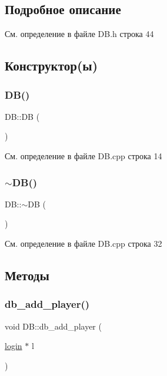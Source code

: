 \subsection{Подробное описание}


См. определение в файле D\+B.\+h строка 44



\subsection{Конструктор(ы)}
\mbox{\label{class_d_b_a29a603c52c10831cddee82518417f992}} 
\subsubsection{\texorpdfstring{DB()}{DB()}}
{\footnotesize\ttfamily D\+B\+::\+DB (\begin{DoxyParamCaption}{ }\end{DoxyParamCaption})}



См. определение в файле D\+B.\+cpp строка 14

\mbox{\label{class_d_b_a7bd1418f67b11d0f752537123e7e6d28}} 
\subsubsection{\texorpdfstring{$\sim$DB()}{~DB()}}
{\footnotesize\ttfamily D\+B\+::$\sim$\+DB (\begin{DoxyParamCaption}{ }\end{DoxyParamCaption})}



См. определение в файле D\+B.\+cpp строка 32



\subsection{Методы}
\mbox{\label{class_d_b_a472c425f9a22c467e4acd0e800153837}} 
\subsubsection{\texorpdfstring{db\_add\_player()}{db\_add\_player()}}
{\footnotesize\ttfamily void D\+B\+::db\+\_\+add\+\_\+player (\begin{DoxyParamCaption}\item[{\mbox{\hyperlink{structlogin}{login}} $\ast$}]{l }\end{DoxyParamCaption})}




